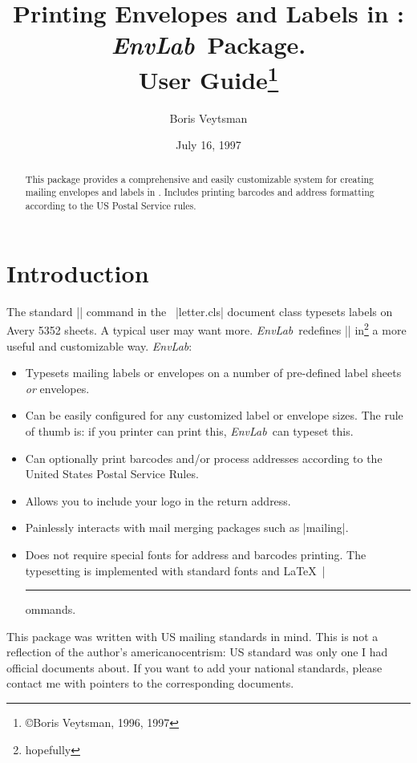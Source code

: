 \documentclass{ltxguide}
\newcommand{\EL}{\textsl{EnvLab}}
\begin{document}
\title{Printing Envelopes and Labels in \LaTeXe: \EL\ Package.\\
User Guide\thanks{\copyright Boris Veytsman, 1996, 1997}}
\author{Boris Veytsman}
\date{July 16, 1997}

\maketitle

\begin{abstract}
  This package provides a comprehensive and easily customizable system
  for creating mailing envelopes and labels in \LaTeXe. Includes
  printing barcodes and address formatting according to the US Postal
  Service rules.
\end{abstract}
 
\tableofcontents
\listoffigures
\listoftables




\section{Introduction}
\label{sec:Intro}

The standard |\makelabels| command in the \LaTeXe\ |letter.cls|
document class typesets labels on Avery 5352 sheets. A typical user
may want more. \EL\ redefines |\makelabels| in\footnote{hopefully}
a more useful and customizable way. \EL:
\begin{itemize}
\item Typesets mailing labels or envelopes on a number
  of pre-defined label sheets \emph{or} envelopes.
\item Can be easily configured for any customized label or envelope
  sizes. The rule of thumb is: if you printer can print this, \EL\ can
  typeset this.
\item Can optionally print barcodes and/or process addresses according
  to the United States Postal Service Rules.
\item Allows you to include your logo in the return address.
\item Painlessly interacts with mail merging packages such as
  |mailing|.
\item Does not require special fonts for address and barcodes
  printing.  The typesetting is implemented with standard fonts and
  \LaTeX\ |\rule| commands.
\end{itemize}

This package was written with US mailing standards in mind. This is
not a reflection of the author's americanocentrism: US standard was
only one I had official documents about. If you want to add your
national standards, please contact me with pointers to the
corresponding documents.
\end{document}
